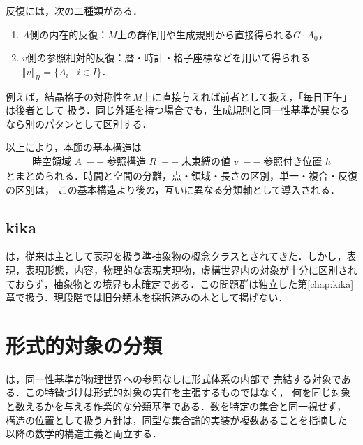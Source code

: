 \documentclass[../../main-detail.tex]{subfiles}
\begin{document}
反復には，次の二種類がある．
\begin{enumerate}
    \item $A$側の内在的反復：$M$上の群作用や生成規則から直接得られる$G\cdot A_0$，
    \item $v$側の参照相対的反復：暦・時計・格子座標などを用いて得られる
    $\llbracket v\rrbracket_R=\{A_i\mid i\in I\}$．
\end{enumerate}
例えば，結晶格子の対称性を$M$上に直接与えれば前者として扱え，「毎日正午」は後者として
扱う．同じ外延を持つ場合でも，生成規則と同一性基準が異なるなら別のパタンとして区別する．

以上により，本節の基本構造は
\begin{align*}
    \boxed{
      \text{時空領域 }A
      \;--\;
      \text{参照構造 }R
      \;--\;
      \text{未束縛の値 }v
      \;--\;
      \text{参照付き位置 }h
    }
\end{align*}
とまとめられる．時間と空間の分離，点・領域・長さの区別，単一・複合・反復の区別は，
この基本構造より後の，互いに異なる分類軸として導入される．

\subsection{kika}
は，従来は主として表現を扱う準抽象物の概念クラスとされてきた．しかし，表現，表現形態，内容，物理的な表現実現物，虚構世界内の対象が十分に区別されておらず，抽象物との境界も未確定である．この問題群は独立した第\ref{chap:kika}章で扱う．現段階では旧分類木を採択済みの木として掲げない．
\section{形式的対象の分類}\label{sec:stcilkant-classification}

は，同一性基準が物理世界への参照なしに形式体系の内部で
完結する対象である．この特徴づけは形式的対象の実在を主張するものではなく，
何を同じ対象と数えるかを与える作業的な分類基準である．数を特定の集合と同一視せず，
構造の位置として扱う方針は，同型な集合論的実装が複数あることを指摘した
\citet{benacerraf1965}以降の数学的構造主義と両立する\citep{shapiro1997}．
\end{document}
